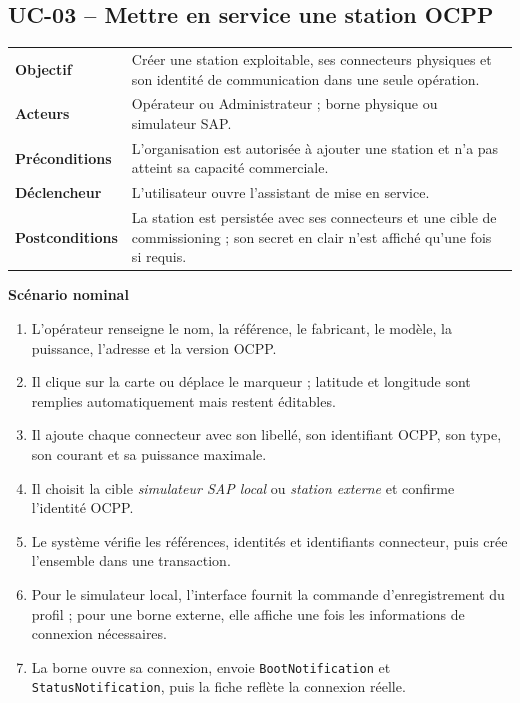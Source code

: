 \subsection{UC-03 -- Mettre en service une station OCPP}

\begin{table}[H]
  \centering
  \begin{tabularx}{\textwidth}{@{}C{3.3cm}Y@{}}
    \toprule
    \textbf{Objectif} & Créer une station exploitable, ses connecteurs physiques et
    son identité de communication dans une seule opération.\\
    \textbf{Acteurs} & Opérateur ou Administrateur ; borne physique ou simulateur SAP.\\
    \textbf{Préconditions} & L'organisation est autorisée à ajouter une station et
    n'a pas atteint sa capacité commerciale.\\
    \textbf{Déclencheur} & L'utilisateur ouvre l'assistant de mise en service.\\
    \textbf{Postconditions} & La station est persistée avec ses connecteurs et une
    cible de commissioning ; son secret en clair n'est affiché qu'une fois si requis.\\
    \bottomrule
  \end{tabularx}
\end{table}

\textbf{Scénario nominal}
\begin{enumerate}[leftmargin=8mm]
  \item L'opérateur renseigne le nom, la référence, le fabricant, le modèle, la
  puissance, l'adresse et la version OCPP.
  \item Il clique sur la carte ou déplace le marqueur ; latitude et longitude sont
  remplies automatiquement mais restent éditables.
  \item Il ajoute chaque connecteur avec son libellé, son identifiant OCPP, son type,
  son courant et sa puissance maximale.
  \item Il choisit la cible \emph{simulateur SAP local} ou \emph{station externe} et
  confirme l'identité OCPP.
  \item Le système vérifie les références, identités et identifiants connecteur, puis
  crée l'ensemble dans une transaction.
  \item Pour le simulateur local, l'interface fournit la commande d'enregistrement du
  profil ; pour une borne externe, elle affiche une fois les informations de
  connexion nécessaires.
  \item La borne ouvre sa connexion, envoie \texttt{BootNotification} et
  \texttt{StatusNotification}, puis la fiche reflète la connexion réelle.
\end{enumerate}

